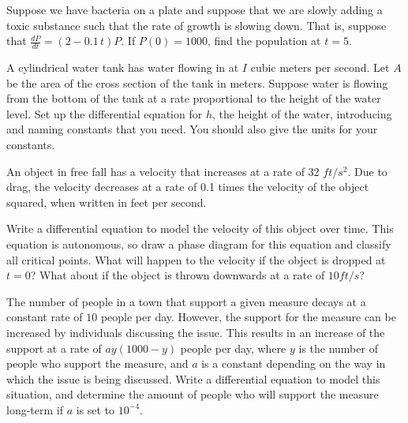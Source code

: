 \documentclass{ximera}
\begin{document}
\begin{exercise}%
    Suppose we have bacteria on a plate and suppose that we are slowly adding a toxic substance such that the rate of growth is slowing down.  That is, suppose that $\frac{dP}{dt} = (2-0.1\,t)P$.  If $P(0) = 1000$, find the population at $t=5$.
\end{exercise}

\begin{exercise}%
    A cylindrical water tank has water flowing in at $I$ cubic meters per second. Let $A$ be the area of the cross section of the tank in meters. Suppose water is flowing from the bottom of the tank at a rate proportional to the height of the water level.  Set up the differential equation for $h$, the height of the water, introducing and naming constants that you need.  You should also give the units for your constants.
\end{exercise}

\begin{exercise}
    An object in free fall has a velocity that increases at a rate of 32 $ft/s^2$. Due to drag, the velocity decreases at a rate of 0.1 times the velocity of the object squared, when written in feet per second. 
    \begin{tasks}
        \task Write a differential equation to model the velocity of this object over time.
        \task This equation is autonomous, so draw a phase diagram for this equation and classify all critical points.
        \task What will happen to the velocity if the object is dropped at $t=0$? What about if the object is thrown downwards at a rate of $10 ft/s$?
    \end{tasks}
\end{exercise}

\begin{exercise}
    The number of people in a town that support a given measure decays at a constant rate of $10$ people per day. However, the support for the measure can be increased by individuals discussing the issue. This results in an increase of the support at a rate of $ay(1000 - y)$ people per day, where $y$ is the number of people who support the measure, and $a$ is a constant depending on the way in which the issue is being discussed. Write a differential equation to model this situation, and determine the amount of people who will support the measure long-term if $a$ is set to $10^{-4}$.  
\end{exercise}
\end{document}
